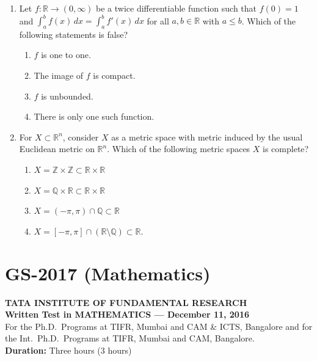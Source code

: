 \documentclass[11pt, a4paper]{article}
\begin{document}
\begin{enumerate}[resume]
  \item Let $f: \mathbb{R} \to (0, \infty)$ be a twice differentiable function such that $f(0) = 1$ and $\int_a^b f(x)\,dx = \int_a^b f'(x)\,dx$ for all $a, b \in \mathbb{R}$ with $a \le b$. Which of the following statements is false?
  \begin{enumerate}[label=\Alph*.]
    \item $f$ is one to one.
    \item The image of $f$ is compact.
    \item $f$ is unbounded.
    \item There is only one such function.
  \end{enumerate}

  \item For $X \subset \mathbb{R}^n$, consider $X$ as a metric space with metric induced by the usual Euclidean metric on $\mathbb{R}^n$. Which of the following metric spaces $X$ is complete?
  \begin{enumerate}[label=\Alph*.]
    \item $X = \mathbb{Z} \times \mathbb{Z} \subset \mathbb{R} \times \mathbb{R}$
    \item $X = \mathbb{Q} \times \mathbb{R} \subset \mathbb{R} \times \mathbb{R}$
    \item $X = (-\pi, \pi) \cap \mathbb{Q} \subset \mathbb{R}$
    \item $X = [-\pi, \pi] \cap (\mathbb{R} \setminus \mathbb{Q}) \subset \mathbb{R}$.
  \end{enumerate}
\end{enumerate}

\newpage

\section{GS-2017 (Mathematics)}

\begin{center}
  \textbf{TATA INSTITUTE OF FUNDAMENTAL RESEARCH}\\
  \textbf{Written Test in MATHEMATICS --- December 11, 2016}\\
  For the Ph.D.\ Programs at TIFR, Mumbai and CAM \& ICTS, Bangalore and for the Int.\ Ph.D.\ Programs at TIFR, Mumbai and CAM, Bangalore.\\
  \textbf{Duration:} Three hours (3 hours)
\end{center}
\end{document}
